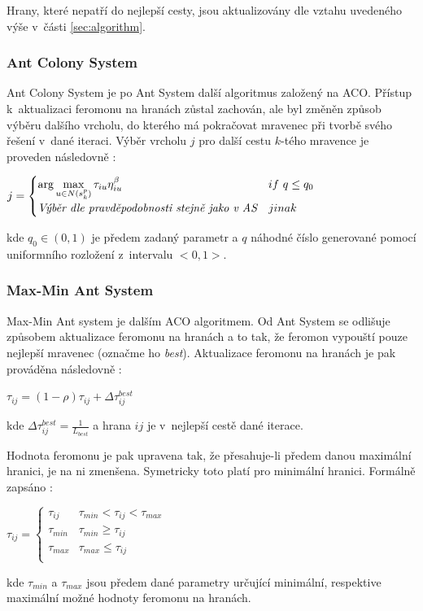 \documentclass[a4paper, 12pt]{article}
\begin{document}
Hrany, které nepatří do nejlepší cesty, jsou aktualizovány dle vztahu uvedeného výše v~části \ref{sec:algorithm}.

\subsubsection{Ant Colony System}
Ant Colony System je po Ant System další algoritmus založený na ACO. Přístup k~aktualizaci feromonu na hranách zůstal zachován, ale byl změněn způsob
výběru dalšího vrcholu, do kterého má pokračovat mravenec při tvorbě svého řešení v~dané iteraci. Výběr vrcholu $j$ pro další cestu $k$-tého mravence
je proveden následovně \cite{aco:acs}:
\begin{center}
  $j = 
  \begin{cases}
    \arg\max\limits_{u\in N(s^p_k)}\tau_{iu}\eta^{\beta}_{iu} & if\ q\leq q_0\\
    \emph{Výběr dle pravděpodobnosti stejně jako v~AS} & jinak
   \end{cases}
   $
\end{center}
kde $q_0\in (0,1)$ je předem zadaný parametr a $q$ náhodné číslo generované pomocí uniformního rozložení z~intervalu $<0,1>$.

\subsubsection{Max-Min Ant System}
Max-Min Ant system je dalším ACO algoritmem. Od Ant System se odlišuje způsobem aktualizace feromonu na hranách a to tak, že feromon vypouští pouze
nejlepší mravenec (označme ho \emph{best}). Aktualizace feromonu na hranách je pak prováděna následovně \cite{aco:maxmin}:
\begin{center}
  $\tau_{ij}=(1-\rho)\tau_{ij}+\Delta\tau_{ij}^{best}$
\end{center}
kde $\Delta\tau_{ij}^{best}=\frac{1}{L_{best}}$ a hrana $ij$ je v~nejlepší cestě dané iterace.

Hodnota feromonu je pak upravena tak, že přesahuje-li předem danou maximální hranici, je na ni zmenšena. Symetricky toto platí pro minimální hranici. Formálně
zapsáno \cite{aco:maxmin}:
\begin{center}
  $\tau_{ij} = 
  \begin{cases}
    \tau_{ij} & \tau_{min} < \tau_{ij} < \tau_{max}\\
    \tau_{min} & \tau_{min} \geq \tau_{ij}\\
    \tau_{max} & \tau_{max} \leq \tau_{ij}\\
   \end{cases}
   $
\end{center}
kde $\tau_{min}$ a $\tau_{max}$ jsou předem dané parametry určující minimální, respektive maximální možné hodnoty feromonu na hranách.
\end{document}
